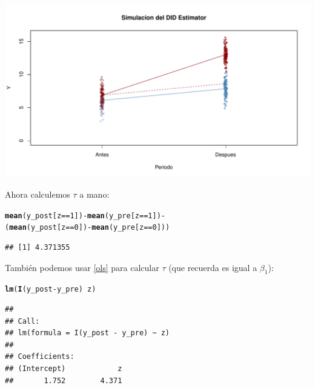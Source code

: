 \documentclass[onesided]{article}\usepackage[]{graphicx}\usepackage[]{color}
\makeatletter
\def\maxwidth{ %
  \ifdim\Gin@nat@width>\linewidth
    \linewidth
  \else
    \Gin@nat@width
  \fi
}
\newcommand{\hlnum}[1]{\textcolor[rgb]{0.686,0.059,0.569}{#1}}%
\newcommand{\hlopt}[1]{\textcolor[rgb]{0,0,0}{#1}}%
\newcommand{\hlstd}[1]{\textcolor[rgb]{0.345,0.345,0.345}{#1}}%
\newcommand{\hlkwd}[1]{\textcolor[rgb]{0.737,0.353,0.396}{\textbf{#1}}}%
\newenvironment{kframe}{%
 \def\at@end@of@kframe{}%
 \ifinner\ifhmode%
  \def\at@end@of@kframe{\end{minipage}}%
  \begin{minipage}{\columnwidth}%
 \fi\fi%
 \def\FrameCommand##1{\hskip\@totalleftmargin \hskip-\fboxsep
 \colorbox{shadecolor}{##1}\hskip-\fboxsep
     \hskip-\linewidth \hskip-\@totalleftmargin \hskip\columnwidth}%
 \MakeFramed {\advance\hsize-\width
   \@totalleftmargin\z@ \linewidth\hsize
   \@setminipage}}%
 {\par\unskip\endMakeFramed%
 \at@end@of@kframe}
\newenvironment{knitrout}{}{} %
\makeatother
\begin{document}
\begin{knitrout}
{\centering \includegraphics[width=\maxwidth]{figure/dif:dif:Data-1} 

}



\end{knitrout}

Ahora calculemos $\tau$ a mano:

\begin{knitrout}
\color{fgcolor}\begin{kframe}
\begin{alltt}
\hlkwd{mean}\hlstd{(y_post[z} \hlopt{==} \hlnum{1}\hlstd{])} \hlopt{-} \hlkwd{mean}\hlstd{(y_pre[z} \hlopt{==} \hlnum{1}\hlstd{])} \hlopt{-}
\hlstd{(}\hlkwd{mean}\hlstd{(y_post[z} \hlopt{==} \hlnum{0}\hlstd{])} \hlopt{-} \hlkwd{mean}\hlstd{(y_pre[z} \hlopt{==} \hlnum{0}\hlstd{]))}
\end{alltt}
\begin{verbatim}
## [1] 4.371355
\end{verbatim}
\end{kframe}
\end{knitrout}

Tambi\'en podemos usar \autoref{ols} para calcular $\tau$ (que recuerda es igual a $\beta_{1}$):

\begin{knitrout}
\color{fgcolor}\begin{kframe}
\begin{alltt}
\hlkwd{lm}\hlstd{(}\hlkwd{I}\hlstd{(y_post} \hlopt{-} \hlstd{y_pre)} \hlopt{~} \hlstd{z)}
\end{alltt}
\begin{verbatim}
## 
## Call:
## lm(formula = I(y_post - y_pre) ~ z)
## 
## Coefficients:
## (Intercept)            z  
##       1.752        4.371
\end{verbatim}
\end{kframe}
\end{knitrout}
\end{document}
